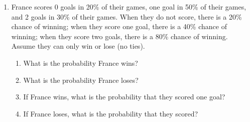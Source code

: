\documentclass{article}
\begin{document}
\begin{enumerate}
    \item France scores 0 goals in 20\% of their games, one goal in 50\% of their games, and 2 goals in 30\% of their games. When they do not score, there is a 20\% chance of winning; when they score one goal, there is a 40\% chance of winning; when they score two goals, there is a 80\% chance of winning. Assume they can only win or lose (no ties).\vspace{150pt}
    \begin{enumerate}
        \item What is the probability France wins?\vspace{70pt}
        \item What is the probability France loses?\vspace{70pt}
        \item If France wins, what is the probability that they scored one goal?\vspace{70pt}
        \item If France loses, what is the probability that they scored?\vspace{70pt}
    \end{enumerate}
\end{enumerate}
\end{document}
